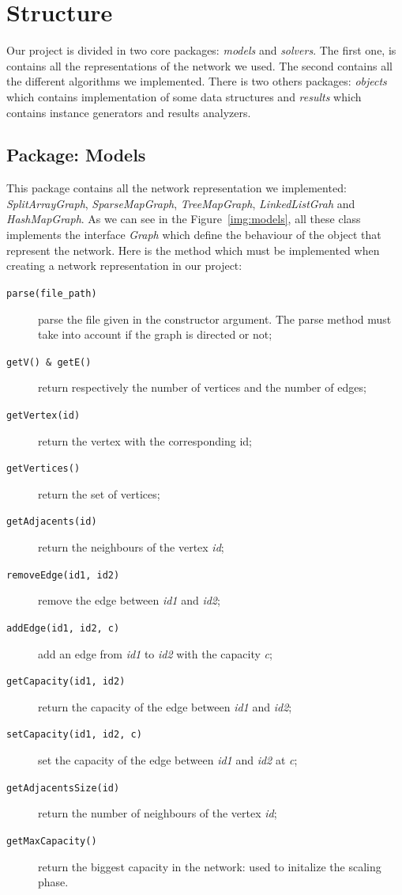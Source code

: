 \section{Structure}

Our project is divided in two core packages: \textit{models} and \textit{solvers}. The first one, is contains all the representations of the network we used. The second contains all the different algorithms we implemented. There is two others packages: \textit{objects} which contains implementation of some data structures and \textit{results} which contains instance generators and results analyzers.

\subsection{Package: Models}

This package contains all the network representation we implemented: \textit{SplitArrayGraph}, \textit{SparseMapGraph}, \textit{TreeMapGraph}, \textit{LinkedListGrah} and \textit{HashMapGraph}. As we can see in the Figure~\ref{img:models}, all these class implements the interface \textit{Graph} which define the behaviour of the object that represent the network. Here is the method which must be implemented when creating a network representation in our project:
\begin{description}
	\item[\texttt{parse(file\_path)}] parse the file given in the constructor argument. The parse method must take into account if the graph is directed or not;
	\item[\texttt{getV() \& getE()}] return respectively the number of vertices and the number of edges;
	\item[\texttt{getVertex(id)}] return the vertex with the corresponding id;
	\item[\texttt{getVertices()}] return the set of vertices;
	\item[\texttt{getAdjacents(id)}] return the neighbours of the vertex \textit{id};
	\item[\texttt{removeEdge(id1, id2)}] remove the edge between \textit{id1} and \textit{id2};
	\item[\texttt{addEdge(id1, id2, c)}] add an edge from \textit{id1} to \textit{id2} with the capacity \textit{c};
	\item[\texttt{getCapacity(id1, id2)}] return the capacity of the edge between \textit{id1} and \textit{id2};
	\item[\texttt{setCapacity(id1, id2, c)}] set the capacity of the edge between \textit{id1} and \textit{id2} at \textit{c};
	\item[\texttt{getAdjacentsSize(id)}] return the number of neighbours of the vertex \textit{id};
	\item[\texttt{getMaxCapacity()}] return the biggest capacity in the network: used to initalize the scaling phase.
\end{description}

